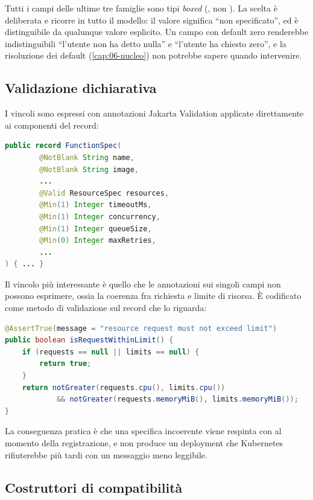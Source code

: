 Tutti i campi delle ultime tre famiglie sono tipi \emph{boxed}
(, non ). La scelta \`e deliberata e ricorre in tutto il
modello: il valore  significa ``non specificato'', ed \`e
distinguibile da qualunque valore esplicito. Un campo  con default
zero renderebbe indistinguibili ``l'utente non ha detto nulla'' e ``l'utente ha
chiesto zero'', e la risoluzione dei default (\cref{cap:06-nucleo}) non
potrebbe sapere quando intervenire.

\subsection{Validazione dichiarativa}

I vincoli sono espressi con annotazioni Jakarta Validation applicate direttamente
ai componenti del record:

\begin{lstlisting}[language=Java]
public record FunctionSpec(
        @NotBlank String name,
        @NotBlank String image,
        ...
        @Valid ResourceSpec resources,
        @Min(1) Integer timeoutMs,
        @Min(1) Integer concurrency,
        @Min(1) Integer queueSize,
        @Min(0) Integer maxRetries,
        ...
) { ... }
\end{lstlisting}

Il vincolo pi\`u interessante \`e quello che le annotazioni sui singoli campi non
possono esprimere, ossia la coerenza fra richiesta e limite di risorsa. \`E
codificato come metodo di validazione sul record che lo riguarda:

\begin{lstlisting}[language=Java, caption={Vincolo relazionale in
\code{ResourceSpec}.}]
@AssertTrue(message = "resource request must not exceed limit")
public boolean isRequestWithinLimit() {
    if (requests == null || limits == null) {
        return true;
    }
    return notGreater(requests.cpu(), limits.cpu())
            && notGreater(requests.memoryMiB(), limits.memoryMiB());
}
\end{lstlisting}

La conseguenza pratica \`e che una specifica incoerente viene respinta con
 al momento della registrazione, e non produce un deployment che
Kubernetes rifiuterebbe pi\`u tardi con un messaggio meno leggibile.

\subsection{Costruttori di compatibilit\`a}

